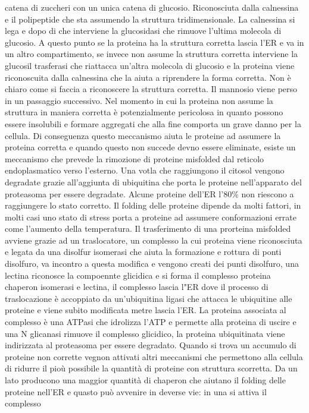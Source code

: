 catena di zuccheri con un unica catena di glucosio. Riconosciuta dalla calnessina e il polipeptide che sta assumendo la struttura tridimensionale. La calnessina si lega e dopo di che
interviene la glucosidasi che rimuove l'ultima molecola di glucosio. A questo punto se la proteina ha la struttura corretta lascia l'ER e va in un altro compartimento, se invece non
assume la struttura corretta interviene la glucosil trasferasi che riattacca un'altra molecola di glucosio e la proteina viene riconoscuita dalla calnessina che la aiuta a riprendere 
la forma corretta. Non \`e chiaro come si faccia a riconoscere la struttura corretta. Il mannosio viene perso in un passaggio successivo. Nel momento in cui la proteina non assume la
struttura in maniera corretta \`e potenzialmente pericolosa in quanto possono essere insolubili e formare aggregati che alla fine comporta un grave danno per la cellula. Di conseguenza
questo meccanismo aiuta le proteine ad assumere la proteina corretta e quando questo non succede devno essere eliminate, esiste un meccanismo che prevede la rimozione di proteine
misfolded dal reticolo endoplasmatico verso l'esterno. Una votla che raggiungono il citosol vengono degradate grazie all'aggiunta di ubiquitina che porta le proteine nell'apparato del 
proteasoma per essere degradate. Alcune proteine dell'ER l'$80\%$ non riescono a raggiungere lo stato corretto. Il folding delle proteine dipende da molti fattori, in molti casi 
uno stato di stress porta a proteine ad assumere conformazioni errate come l'aumento della temperatura. Il trasferimento di una prorteina misfolded avviene grazie ad un traslocatore, 
un complesso la cui proteina viene riconosciuta e legata da una disolfur isomerasi che aiuta la formazione e rottura di ponti disolfuro, va incontro a questa modifica e vengono creati
dei punti disolfuro, una lectina riconosce la compoennte glicidica e si forma il complesso proteina chaperon isomerasi e lectina, il complesso lascia l"ER dove il processo di 
traslocazione \`e accoppiato da un'ubiquitina ligasi che attacca le ubiquitine alle proteine e viene subito modificata metre lascia l'ER. La proteina associata al complesso \`e una ATPasi
che idrolizza l'ATP e permette alla proteina di uscire e una N glicanasi rimuove il complesso glicidico, la proteina ubiquitinata viene indirizzata al proteasoma per essere degradato. 
Quando si trova un accumulo di proteine non corrette vegnon attivati altri meccanismi che permettono alla cellula di ridurre il pio\`u possibile la quantit\`a di proteine con struttura
scorretta. Da un lato producono una maggior quantit\`a di chaperon che aiutano il folding delle proteine nell'ER e quasto pu\`o avvenire in deverse vie: in una si attiva il complesso
